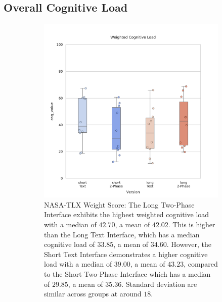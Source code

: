 \subsection{Overall Cognitive Load}
\label{sec:cog}
\begin{figure}[ht]
    \centering
    \begin{subfigure}[b]{0.45\textwidth}
        \centering
        \includegraphics[width=\textwidth]{content/image/results/nasatlx_final_value.pdf}
        \caption{NASA-TLX Weight Score: The Long Two-Phase Interface exhibits the highest weighted cognitive load with a median of $42.70$, a mean of $42.02$. This is higher than the Long Text Interface, which has a median cognitive load of $33.85$, a mean of $34.60$. However, the Short Text Interface demonstrates a higher cognitive load with a median of $39.00$, a mean of $43.23$, compared to the Short Two-Phase Interface which has a median of $29.85$, a mean of $35.36$. Standard deviation are similar across groups at around $18$.}
        \label{fig:nasatlx-final1}
    \end{subfigure}
    \hfill
    \begin{subfigure}[b]{0.47\textwidth}
        \centering

\end{subfigure}
\end{figure}
